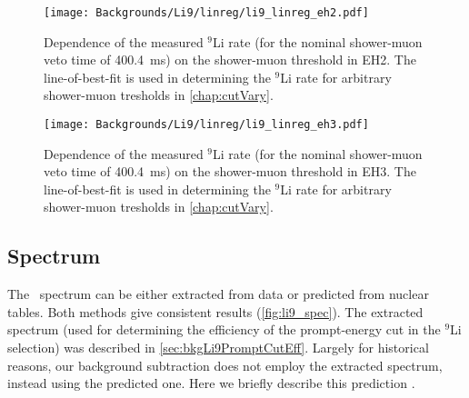 \documentclass[../thesis.tex]{subfiles}
\begin{document}
\begin{figure}[ht]
  \texttt{[image: Backgrounds/Li9/linreg/li9\_linreg\_eh2.pdf]}
  \caption{Dependence of the measured $^9$Li rate (for the nominal shower-muon veto time of 400.4~ms) on the shower-muon threshold in EH2. The line-of-best-fit is used in determining the $^9$Li rate for arbitrary shower-muon tresholds in \autoref{chap:cutVary}.}
  \label{fig:li9_linreg_eh2}
\end{figure}

\begin{figure}[ht]
  \texttt{[image: Backgrounds/Li9/linreg/li9\_linreg\_eh3.pdf]}
  \caption{Dependence of the measured $^9$Li rate (for the nominal shower-muon veto time of 400.4~ms) on the shower-muon threshold in EH3. The line-of-best-fit is used in determining the $^9$Li rate for arbitrary shower-muon tresholds in \autoref{chap:cutVary}.}
  \label{fig:li9_linreg_eh3}
\end{figure}


\begin{comment}
- forming and fitting the histogram %
- - Detail the cuts we use for different muon energy ranges (prompt energy, neutron tag)
- Prompt cut efficiency
- - Extraction of spectrum. Subtraction of IBD spectrum.
- - Uncertainty
- - - Statistical - binomial confidence interval accounting for error bars on subtracted spectrum => 1-2\% (See if can find how Chris did it in code... sounds tricky)
- - - Systematic - Variations in time binning, muon PE cut in background sample => 1\%
- Neutron tag efficiency
- - Uncertainty - 45\% according to doc-10920
- - Nominal value of... 80\%? 60\%?
- Uncertainty from fit
- - Neutron tagging cutoff - 1.5e5 to 1.8e5 => 10\% (NOT IN CHRIS'S TABLE)
- - Binning => <5\% (NOT IN CHRIS'S TABLE) (MENTIONED AT END)
- - B12 => 8\%
- - He8 => 4\%
- Uncertainty of shower veto correction (He8 fraction)
- - Vary He8 fraction from 0 to 15\%
- Conversion from fit result to daily rate
- - Efficiencies of Li9 selection (ntag, pcut)
- - IBD selection efficiencies (veto, mult)
- - Shower veto correction
- - Propagation of uncertainties
\end{comment}

\subsection{Spectrum}
\label{sec:bkgLi9Spectrum}

The \LiHe\ spectrum can be either extracted from data or predicted from nuclear tables. Both methods give consistent results (\autoref{fig:li9_spec}). The extracted spectrum (used for determining the efficiency of the prompt-energy cut in the $^9$Li selection) was described in \autoref{sec:bkgLi9PromptCutEff}. Largely for historical reasons, our background subtraction does not employ the extracted spectrum, instead using the predicted one. Here we briefly describe this prediction \cite{pedroLi9Spec1,pedroLi9Spec2}.
\end{document}
